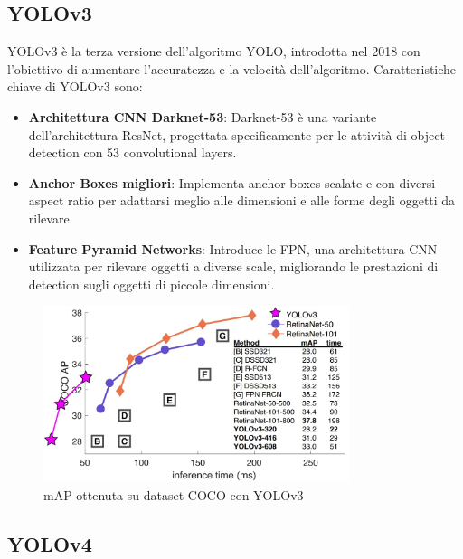 \subsection{YOLOv3}
YOLOv3 è la terza versione dell'algoritmo YOLO, introdotta nel 2018\cite{20} con l'obiettivo di aumentare l'accuratezza e la velocità dell'algoritmo. Caratteristiche chiave di YOLOv3 sono:
\begin{itemize}
  \item \textbf{Architettura CNN Darknet-53}: Darknet-53 è una variante dell'architettura ResNet, progettata specificamente per le attività di object detection con 53 convolutional layers.
  \item \textbf{Anchor Boxes migliori}: Implementa anchor boxes scalate e con diversi aspect ratio per adattarsi meglio alle dimensioni e alle forme degli oggetti da rilevare.
  \item \textbf{Feature Pyramid Networks}: Introduce le FPN, una architettura CNN utilizzata per rilevare oggetti a diverse scale, migliorando le prestazioni di detection sugli oggetti di piccole dimensioni.
\end{itemize}

\vspace{1cm}

\begin{figure}[ht]
    \centering
    \includegraphics[width=0.8\textwidth]{files/capitoli/2-yolo/assets/yolov3-benchmark.jpeg}
    \caption{\label{fig:yolov3-benchmark}mAP ottenuta su dataset COCO con YOLOv3\cite{19}}
\end{figure}

\subsection{YOLOv4}

